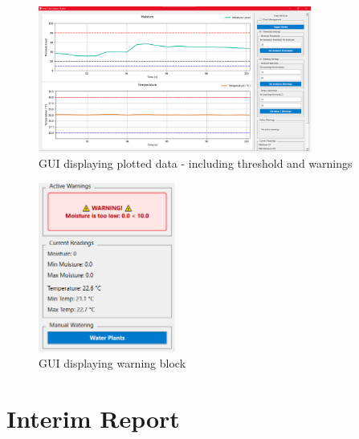 \documentclass[a4paper,11pt]{article}
\begin{document}
\begin{figure}[H]
    \centering
    \includegraphics[width=0.8\textwidth]{3 - Threshold Setting.png}
    \caption{GUI displaying plotted data - including threshold and warnings}
    \label{fig:plotted}
\end{figure}

\begin{figure}[H]
    \centering
    \includegraphics[width=0.4\textwidth]{4 - Warning.png}
    \caption{GUI displaying warning block}
    \label{fig:warning_block}
\end{figure}

\section{Interim Report}
\end{document}

